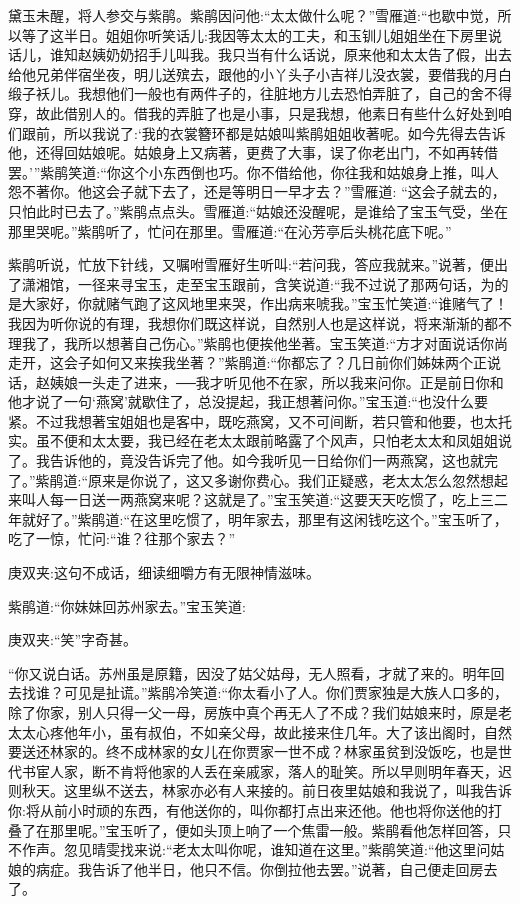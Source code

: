 \begin{parag}
    黛玉未醒，将人参交与紫鹃。紫鹃因问他:“太太做什么呢？”雪雁道:“也歇中觉，所以等了这半日。姐姐你听笑话儿:我因等太太的工夫，和玉钏儿姐姐坐在下房里说话儿，谁知赵姨奶奶招手儿叫我。我只当有什么话说，原来他和太太告了假，出去给他兄弟伴宿坐夜，明儿送殡去，跟他的小丫头子小吉祥儿没衣裳，要借我的月白缎子袄儿。我想他们一般也有两件子的，往脏地方儿去恐怕弄脏了，自己的舍不得穿，故此借别人的。借我的弄脏了也是小事，只是我想，他素日有些什么好处到咱们跟前，所以我说了:‘我的衣裳簪环都是姑娘叫紫鹃姐姐收著呢。如今先得去告诉他，还得回姑娘呢。姑娘身上又病著，更费了大事，误了你老出门，不如再转借罢。’”紫鹃笑道:“你这个小东西倒也巧。你不借给他，你往我和姑娘身上推，叫人怨不著你。他这会子就下去了，还是等明日一早才去？”雪雁道: “这会子就去的，只怕此时已去了。”紫鹃点点头。雪雁道:“姑娘还没醒呢，是谁给了宝玉气受，坐在那里哭呢。”紫鹃听了，忙问在那里。雪雁道:“在沁芳亭后头桃花底下呢。”
\end{parag}


\begin{parag}
    紫鹃听说，忙放下针线，又嘱咐雪雁好生听叫:“若问我，答应我就来。”说著，便出了潇湘馆，一径来寻宝玉，走至宝玉跟前，含笑说道:“我不过说了那两句话，为的是大家好，你就赌气跑了这风地里来哭，作出病来唬我。”宝玉忙笑道:“谁赌气了！我因为听你说的有理，我想你们既这样说，自然别人也是这样说，将来渐渐的都不理我了，我所以想著自己伤心。”紫鹃也便挨他坐著。宝玉笑道:“方才对面说话你尚走开，这会子如何又来挨我坐著？”紫鹃道:“你都忘了？几日前你们姊妹两个正说话，赵姨娘一头走了进来，──我才听见他不在家，所以我来问你。正是前日你和他才说了一句‘燕窝’就歇住了，总没提起，我正想著问你。”宝玉道:“也没什么要紧。不过我想著宝姐姐也是客中，既吃燕窝，又不可间断，若只管和他要，也太托实。虽不便和太太要，我已经在老太太跟前略露了个风声，只怕老太太和凤姐姐说了。我告诉他的，竟没告诉完了他。如今我听见一日给你们一两燕窝，这也就完了。”紫鹃道:“原来是你说了，这又多谢你费心。我们正疑惑，老太太怎么忽然想起来叫人每一日送一两燕窝来呢？这就是了。”宝玉笑道:“这要天天吃惯了，吃上三二年就好了。”紫鹃道:“在这里吃惯了，明年家去，那里有这闲钱吃这个。”宝玉听了，吃了一惊，忙问:“谁？往那个家去？”\begin{note}庚双夹:这句不成话，细读细嚼方有无限神情滋味。\end{note}紫鹃道:“你妹妹回苏州家去。”宝玉笑道:\begin{note}庚双夹:“笑”字奇甚。\end{note}“你又说白话。苏州虽是原籍，因没了姑父姑母，无人照看，才就了来的。明年回去找谁？可见是扯谎。”紫鹃冷笑道:“你太看小了人。你们贾家独是大族人口多的，除了你家，别人只得一父一母，房族中真个再无人了不成？我们姑娘来时，原是老太太心疼他年小，虽有叔伯，不如亲父母，故此接来住几年。大了该出阁时，自然要送还林家的。终不成林家的女儿在你贾家一世不成？林家虽贫到没饭吃，也是世代书宦人家，断不肯将他家的人丢在亲戚家，落人的耻笑。所以早则明年春天，迟则秋天。这里纵不送去，林家亦必有人来接的。前日夜里姑娘和我说了，叫我告诉你:将从前小时顽的东西，有他送你的，叫你都打点出来还他。他也将你送他的打叠了在那里呢。”宝玉听了，便如头顶上响了一个焦雷一般。紫鹃看他怎样回答，只不作声。忽见晴雯找来说:“老太太叫你呢，谁知道在这里。”紫鹃笑道:“他这里问姑娘的病症。我告诉了他半日，他只不信。你倒拉他去罢。”说著，自己便走回房去了。
\end{parag}


